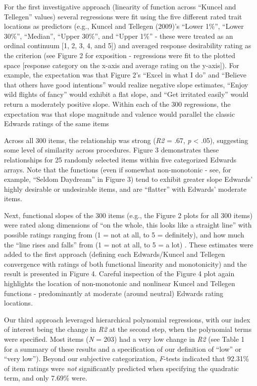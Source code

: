 \documentclass[
  english,
  ,jou]{apa6}
\begin{document}
For the first investigative approach (linearity of function across \enquote{Kuncel and Tellegen} values) several regressions were fit using the five different rated trait locations as predictors (e.g., Kuncel and Tellegen (2009)'s \enquote{Lower 1\%}, \enquote{Lower 30\%}, \enquote{Median}, \enquote{Upper 30\%}, and \enquote{Upper 1\%} - these were treated as an ordinal continuum {[}1, 2, 3, 4, and 5{]}) and averaged response desirability rating as the criterion (see Figure 2 for exposition - regressions were fit to the plotted space {[}response category on the x-axis and average rating on the y-axis{]}). For example, the expectation was that Figure 2's \enquote{Excel in what I do} and \enquote{Believe that others have good intentions} would realize negative slope estimates, \enquote{Enjoy wild flights of fancy} would exhibit a flat slope, and \enquote{Get irritated easily} would return a moderately positive slope. Within each of the 300 regressions, the expectation was that slope magnitude and valence would parallel the classic Edwards ratings of the same items

Across all 300 items, the relationship was strong (\emph{R2} = .67, \emph{p} \textless{} .05), suggesting some level of similarity across procedures. Figure 3 demonstrates these relationships for 25 randomly selected items within five categorized Edwards arrays. Note that the functions (even if somewhat non-monotonic - see, for example, \enquote{Seldom Daydream} in Figure 3) tend to exhibit greater slope Edwards' highly desirable or undesirable items, and are \enquote{flatter} with Edwards' moderate items.

Next, functional slopes of the 300 items (e.g., the Figure 2 plots for all 300 items) were rated along dimensions of \enquote{on the whole, this looks like a straight line} with possible ratings ranging from (1 = not at all, to 5 = definitely), and how much the \enquote{line rises and falls} from (1 = not at all, to 5 = a lot) . These estimates were added to the first approach (defining each Edwards/Kuncel and Tellegen convergence with ratings of both functional linearity and monotonicity) and the result is presented in Figure 4. Careful inspection of the Figure 4 plot again highlights the location of non-monotonic and nonlinear Kuncel and Tellegen functions - predominantly at moderate (around neutral) Edwards rating locations.

Our third approach leveraged hierarchical polynomial regressions, with our index of interest being the change in \emph{R2} at the second step, when the polynomial terms were specified. Most items (\emph{N} = 203) had a very low change in \emph{R2} (see Table 1 for a summary of these results and a specification of our definition of \enquote{low} or \enquote{very low}). Beyond our subjective categorization, \emph{F}-tests indicated that 92.31\% of item ratings were \emph{not} significantly predicted when specifying the quadratic term, and only 7.69\% were.
\end{document}
